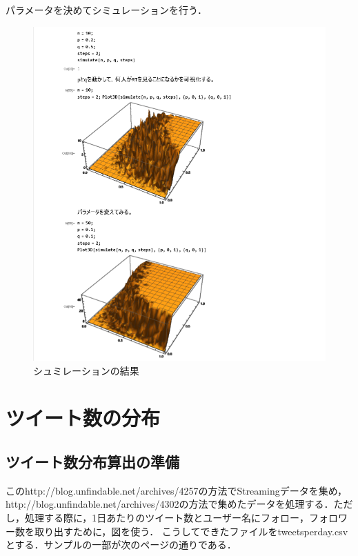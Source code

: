 \newpage

パラメータを決めてシミュレーションを行う\cite{netto3}．

\begin{figure}[h]
\centering
\includegraphics[width=13cm]{syuhou3.png}
\caption{シュミレーションの結果}\label{結果}
\end{figure}

\newpage

\section{ツイート数の分布}

\subsection{ツイート数分布算出の準備}
このhttp://blog.unfindable.net/archives/4257\cite{self}の方法でStreamingデータを集め，http://blog.unfindable.net/archives/4302\cite{self2}の方法で集めたデータを処理する．ただし，処理する際に，1日あたりのツイート数とユーザー名にフォロー，フォロワー数を取り出すために，図\label{ツイートの処理}を使う．
こうしてできたファイルをtweetsperday.csvとする．サンプルの一部が次のページの通りである．

